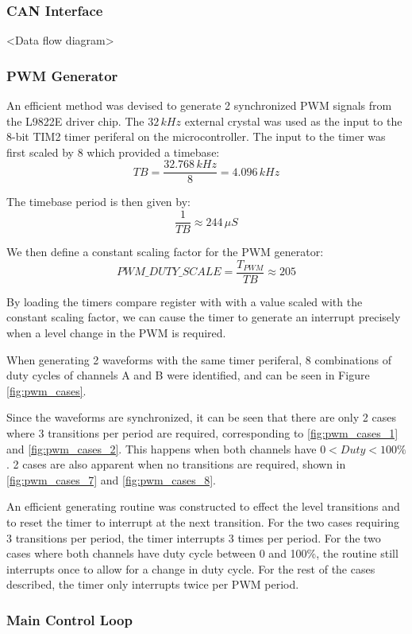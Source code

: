 \subsubsection{CAN Interface}

<Data flow diagram>


\subsubsection{PWM Generator}

An efficient method was devised to generate 2 synchronized PWM signals from the L9822E driver chip. The $32\, kHz$ external crystal was used as the input to the 8-bit TIM2 timer periferal on the microcontroller. The input to the timer was first scaled by 8 which provided a timebase:
\begin{equation}
TB=\frac{32.768\, kHz}{8}=4.096\, kHz
\end{equation}

The timebase period is then given by:
\begin{equation}
\frac{1}{TB}\approx244\,\mu{S}
\end{equation}

We then define a constant scaling factor for the PWM generator:
\begin{equation}
{PWM\_DUTY\_SCALE}=\frac{T_{PWM}}{TB}\approx205
\end{equation}

By loading the timers compare register with with a value scaled with the constant scaling factor, we can cause the timer to generate an interrupt precisely when a level change in the PWM is required.

When generating 2 waveforms with the same timer periferal, 8 combinations of duty cycles of channels A and B were identified, and can be seen in Figure \ref{fig:pwm_cases}.

Since the waveforms are synchronized, it can be seen that there are only 2 cases where 3 transitions per period are required, corresponding to \ref{fig:pwm_cases_1} and \ref{fig:pwm_cases_2}. This happens when both channels have $0<Duty<100\%$. 2 cases are also apparent when no transitions are required, shown in \ref{fig:pwm_cases_7} and \ref{fig:pwm_cases_8}.

An efficient generating routine was constructed to effect the level transitions and to reset the timer to interrupt at the next transition. For the two cases requiring 3 transitions per period, the timer interrupts 3 times per period. For the two cases where both channels have duty cycle between 0 and 100\%, the routine still interrupts once to allow for a change in duty cycle. For the rest of the cases described, the timer only interrupts twice per PWM period.



\subsubsection{Main Control Loop}